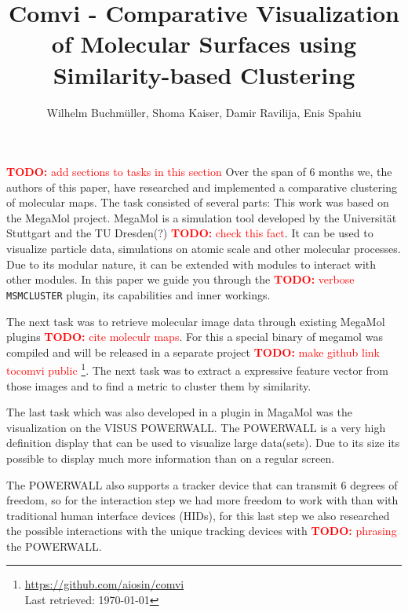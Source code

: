 \documentclass[journal]{vgtc}       %
\title{Comvi - Comparative Visualization of Molecular Surfaces using Similarity-based Clustering}
\author{Wilhelm Buchm\"uller, Shoma Kaiser, Damir Ravilija, Enis Spahiu}
\newcommand{\todo}[1]{\textcolor{red}{\textbf{TODO:} #1}}
\begin{document}

\label{sec:intro}
%
\maketitle
%
\todo{add sections to tasks in this section}%
Over the span of 6 months we, the authors of this paper,  have researched and implemented a comparative clustering of molecular maps.
The task consisted of several parts: This work was based on the MegaMol project. MegaMol is a simulation tool developed by the Universität Stuttgart and the TU Dresden(?) \todo{check this fact}\cite{MegaMol}. It can be used to visualize particle data, simulations on atomic scale and other molecular processes. 
Due to its modular nature, it can be extended with modules to interact with other modules.
In this paper we guide you through the \todo{verbose} \verb|MSMCLUSTER| plugin, its capabilities and inner workings.

The next task was to retrieve molecular image data through existing MegaMol plugins \todo{cite moleculr maps}\cite{molecularmaps}. For this a special binary of megamol was compiled and will be released in a separate project \todo{make github link tocomvi public }\footnote{\url{https://github.com/aiosin/comvi}\\ Last retrieved: \today}.
The next task was to extract a expressive feature vector from those images and to find a metric to cluster them by similarity.

The last task which was also developed in a plugin in MagaMol was the visualization on the VISUS POWERWALL. The POWERWALL is a very high definition display that can be used to visualize large data(sets). Due to its size its possible to display much more information than on a regular screen. 

The POWERWALL also supports a tracker device that can transmit 6 degrees of freedom, so for the interaction step we had more freedom to work with than with traditional human interface  devices  (HIDs), for this last step we also researched the possible interactions with the unique tracking devices with \todo{phrasing} the POWERWALL.
\end{document}
